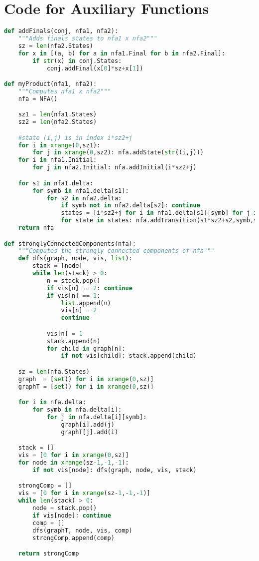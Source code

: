 \chapter{Code for Auxiliary Functions}

\begin{lstlisting}[language=Python, caption = Auxiliary functions]
def addFinals(conj, nfa1, nfa2):
    """Adds finals states to nfa1 x nfa2"""
    sz = len(nfa2.States)
    for x in [(a, b) for a in nfa1.Final for b in nfa2.Final]:
        if str(x) in conj.States:
            conj.addFinal(x[0]*sz+x[1])

def myProduct(nfa1, nfa2):
    """Computes nfa1 x nfa2"""
    nfa = NFA()

    sz1 = len(nfa1.States)
    sz2 = len(nfa2.States)

    #state (i,j) is in index i*sz2+j
    for i in xrange(0,sz1):
        for j in xrange(0,sz2): nfa.addState(str((i,j)))
    for i in nfa1.Initial:
        for j in nfa2.Initial: nfa.addInitial(i*sz2+j)

    for s1 in nfa1.delta:
        for symb in nfa1.delta[s1]:
            for s2 in nfa2.delta:
                if symb not in nfa2.delta[s2]: continue
                states = [i*sz2+j for i in nfa1.delta[s1][symb] for j in nfa2.delta[s2][symb]]
                for state in states: nfa.addTransition(s1*sz2+s2,symb,state)
    return nfa

def stronglyConnectedComponents(nfa):
    """Computes the strongly connected components of nfa"""
    def dfs(graph, node, vis, list):
        stack = [node]
        while len(stack) > 0:
            n = stack.pop()
            if vis[n] == 2: continue
            if vis[n] == 1:
                list.append(n)
                vis[n] = 2
                continue

            vis[n] = 1
            stack.append(n)
            for child in graph[n]:
                if not vis[child]: stack.append(child)

    sz = len(nfa.States)
    graph  = [set() for i in xrange(0,sz)]
    graphT = [set() for i in xrange(0,sz)]

    for i in nfa.delta:
        for symb in nfa.delta[i]:
            for j in nfa.delta[i][symb]:
                graph[i].add(j)
                graphT[j].add(i)

    stack = []
    vis = [0 for i in xrange(0,sz)]
    for node in xrange(sz-1,-1,-1):
        if not vis[node]: dfs(graph, node, vis, stack)

    strongComp = []
    vis = [0 for i in xrange(sz-1,-1,-1)]
    while len(stack) > 0:
        node = stack.pop()
        if vis[node]: continue
        comp = []
        dfs(graphT, node, vis, comp)
        strongComp.append(comp)

    return strongComp
\end{lstlisting}
